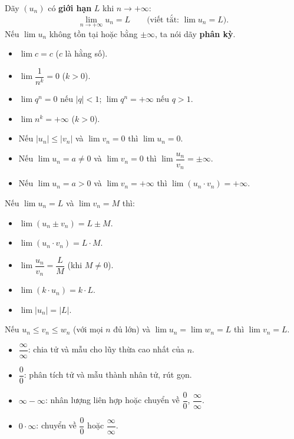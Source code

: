 \documentclass[12pt,a4paper]{article}
\begin{document}
\begin{dinhnghia}
  Dãy $(u_n)$ có \textbf{giới hạn} $L$ khi $n \to +\infty$:
  \[
    \lim_{n \to +\infty} u_n = L
    \qquad\text{(viết tắt: } \lim u_n = L\text{)}.
  \]
  Nếu $\lim u_n$ không tồn tại hoặc bằng $\pm\infty$, ta nói dãy \textbf{phân kỳ}.
\end{dinhnghia}

\begin{congthuc}[title={Các giới hạn cơ bản}]
  \begin{itemize}
    \item $\lim c = c$ \;($c$ là hằng số).
    \item $\lim \dfrac{1}{n^k} = 0$ \;($k > 0$).
    \item $\lim q^n = 0$ nếu $|q| < 1$; \quad $\lim q^n = +\infty$ nếu $q > 1$.
    \item $\lim n^k = +\infty$ \;($k > 0$).
    \item Nếu $|u_n| \le |v_n|$ và $\lim v_n = 0$ thì $\lim u_n = 0$.
    \item Nếu $\lim u_n = a \ne 0$ và $\lim v_n = 0$ thì $\lim \dfrac{u_n}{v_n} = \pm\infty$.
    \item Nếu $\lim u_n = a > 0$ và $\lim v_n = +\infty$ thì $\lim(u_n \cdot v_n) = +\infty$.
  \end{itemize}
\end{congthuc}

\begin{tinhchat}[title={Quy tắc tính giới hạn}]
  Nếu $\lim u_n = L$ và $\lim v_n = M$ thì:
  \begin{itemize}
    \item $\lim(u_n \pm v_n) = L \pm M$.
    \item $\lim(u_n \cdot v_n) = L \cdot M$.
    \item $\lim \dfrac{u_n}{v_n} = \dfrac{L}{M}$ \;(khi $M \ne 0$).
    \item $\lim(k \cdot u_n) = k \cdot L$.
    \item $\lim |u_n| = |L|$.
  \end{itemize}
\end{tinhchat}

\begin{dinhly}[title={Định lý kẹp (Sandwich)}]
  Nếu $u_n \le v_n \le w_n$ (với mọi $n$ đủ lớn) và $\lim u_n = \lim w_n = L$ thì $\lim v_n = L$.
\end{dinhly}

\begin{phuongphap}[title={Xử lý dạng vô định}]
  \begin{itemize}
    \item $\dfrac{\infty}{\infty}$: chia tử và mẫu cho lũy thừa cao nhất của $n$.
    \item $\dfrac{0}{0}$: phân tích tử và mẫu thành nhân tử, rút gọn.
    \item $\infty - \infty$: nhân lượng liên hợp hoặc chuyển về $\dfrac{0}{0}$, $\dfrac{\infty}{\infty}$.
    \item $0 \cdot \infty$: chuyển về $\dfrac{0}{0}$ hoặc $\dfrac{\infty}{\infty}$.
  \end{itemize}
\end{phuongphap}
\end{document}
